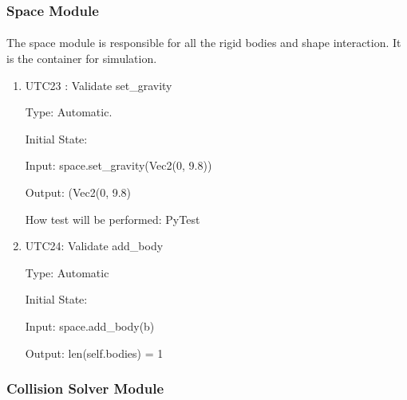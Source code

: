 \documentclass[12pt, titlepage]{article}
\begin{document}
\subsubsection{Space Module}

\paragraph{}
The space module is responsible for all the rigid bodies and shape interaction. It is the container for simulation.
\begin{enumerate}
	
	
	\item{UTC23} {: Validate set\_gravity \\}
	
	Type: Automatic.
	
	Initial State: 
	
	Input: space.set\_gravity(Vec2(0, 9.8))
	
	Output: (Vec2(0, 9.8)
	
	How test will be performed: PyTest 
	
	\item{UTC24}{: Validate add\_body\\}
	
	Type: Automatic
	
	Initial State: 
	
	Input: space.add\_body(b)
	
	Output: len(self.bodies) = 1
	

	\end{enumerate}

\subsubsection{Collision Solver Module}
\end{document}
